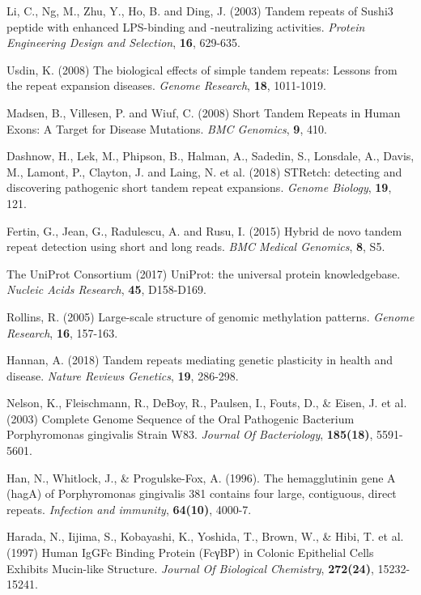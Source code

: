 \documentclass[a4,center,fleqn]{NAR}
\begin{document}
\begin{thebibliography}{4}
Li, C., Ng, M., Zhu, Y., Ho, B. and Ding, J. (2003) 
Tandem repeats of Sushi3 peptide with enhanced LPS-binding and -neutralizing activities. 
\textit{Protein Engineering Design and Selection}, \textbf{16}, 629-635.

Usdin, K. (2008) 
The biological effects of simple tandem repeats: Lessons from the repeat expansion diseases. 
\textit{Genome Research}, \textbf{18}, 1011-1019.

Madsen, B., Villesen, P. and Wiuf, C. (2008) 
Short Tandem Repeats in Human Exons: A Target for Disease Mutations. 
\textit{BMC Genomics}, \textbf{9}, 410.

Dashnow, H., Lek, M., Phipson, B., Halman, A., Sadedin, S., Lonsdale, A., Davis, M., Lamont, P., Clayton, J. and Laing, N. et al. (2018) 
STRetch: detecting and discovering pathogenic short tandem repeat expansions. 
\textit{Genome Biology}, \textbf{19}, 121.

Fertin, G., Jean, G., Radulescu, A. and Rusu, I. (2015)
 Hybrid de novo tandem repeat detection using short and long reads. 
\textit{BMC Medical Genomics}, \textbf{8}, S5.

The UniProt Consortium (2017)
UniProt: the universal protein knowledgebase. 
\textit{Nucleic Acids Research}, \textbf{45}, D158-D169.

Rollins, R. (2005)
Large-scale structure of genomic methylation patterns. 
\textit{Genome Research}, \textbf{16}, 157-163.

Hannan, A. (2018) 
Tandem repeats mediating genetic plasticity in health and disease. 
\textit{Nature Reviews Genetics}, \textbf{19}, 286-298.

Nelson, K., Fleischmann, R., DeBoy, R., Paulsen, I., Fouts, D., \& Eisen, J. et al. (2003)
Complete Genome Sequence of the Oral Pathogenic Bacterium Porphyromonas gingivalis Strain W83. 
\textit{Journal Of Bacteriology}, \textbf{185(18)}, 5591-5601.

Han, N., Whitlock, J., \& Progulske-Fox, A. (1996). 
The hemagglutinin gene A (hagA) of Porphyromonas gingivalis 381 contains four large, contiguous, direct repeats. 
\textit{Infection and immunity}, \textbf{64(10)}, 4000-7.

Harada, N., Iijima, S., Kobayashi, K., Yoshida, T., Brown, W., \& Hibi, T. et al. (1997)
Human IgGFc Binding Protein (FcγBP) in Colonic Epithelial Cells Exhibits Mucin-like Structure. 
\textit{Journal Of Biological Chemistry}, \textbf{272(24)}, 15232-15241.


\end{thebibliography}
\end{document}
